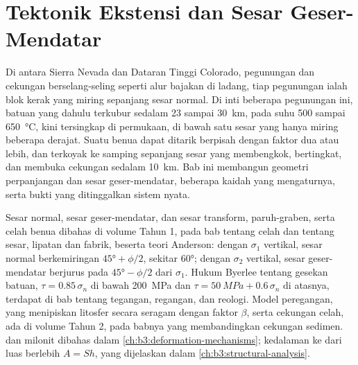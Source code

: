 \chapter{Tektonik Ekstensi dan Sesar Geser-Mendatar}\label{ch:b3:extension-strike-slip}

Di antara Sierra Nevada dan Dataran Tinggi Colorado, pegunungan dan cekungan
berselang-seling seperti alur bajakan di ladang, tiap pegunungan ialah blok kerak yang miring
sepanjang sesar normal. Di inti beberapa pegunungan ini, batuan yang dahulu
terkubur sedalam 23 sampai \qty{30}{km}, pada suhu 500 sampai \qty{650}{\celsius}, kini
tersingkap di permukaan, di bawah satu sesar yang hanya miring beberapa derajat. Suatu benua dapat
ditarik berpisah dengan faktor dua atau lebih, dan terkoyak ke samping sepanjang sesar
yang membengkok, bertingkat, dan membuka cekungan sedalam \qty{10}{km}. Bab ini membangun
geometri perpanjangan dan sesar geser-mendatar, beberapa kaidah yang
mengaturnya, serta bukti yang ditinggalkan sistem nyata.

\begin{recall}
Sesar normal, sesar geser-mendatar, dan sesar transform, paruh-graben, serta
celah benua dibahas di volume Tahun 1, pada bab tentang celah dan tentang sesar, lipatan
dan fabrik, beserta teori Anderson: dengan $\sigma_1$ vertikal, sesar normal
berkemiringan $\ang{45} + \phi/2$, sekitar \ang{60}; dengan $\sigma_2$ vertikal, sesar geser-mendatar
berjurus pada $\ang{45} - \phi/2$ dari $\sigma_1$. Hukum Byerlee tentang gesekan batuan,
$\tau = 0.85\,\sigma_n$ di bawah \qty{200}{MPa} dan $\tau =
\qty{50}{MPa} + 0.6\,\sigma_n$ di atasnya, terdapat di bab tentang tegangan, regangan, dan
reologi. Model peregangan, yang menipiskan litosfer secara seragam
dengan faktor $\beta$, serta cekungan celah, ada di volume Tahun 2, pada babnya
yang membandingkan cekungan sedimen.  dan milonit dibahas dalam
\cref{ch:b3:deformation-mechanisms}; kedalaman ke  dari luas berlebih
$A = Sh$, yang dijelaskan dalam \cref{ch:b3:structural-analysis}.
\end{recall}

